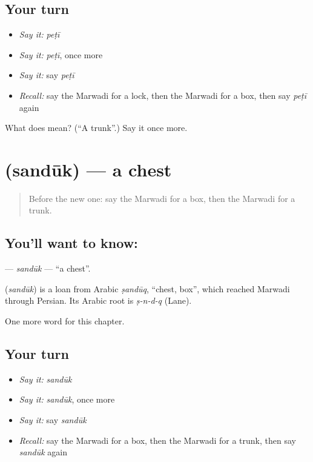 \subsection*{Your turn}
\begin{itemize}
\raggedright
  \item \emph{Say it:} \emph{peṭī}
  \item \emph{Say it:} \emph{peṭī}, once more
  \item \emph{Say it:} say \emph{peṭī}
  \item \emph{Recall:} say the Marwadi for a lock, then the Marwadi for a box, then say \emph{peṭī} again
\end{itemize}

\begin{tcolorbox}[breakable,colback=teal!4,colframe=teal!35!black,title={Before you move on}]
What does  mean? (\textquotedblleft{}A trunk\textquotedblright{}.) Say it once more.
\end{tcolorbox}
\section[\texorpdfstring{\mw{संदूक} (sandūk)}{संदूक (sandūk)}]{ (sandūk) — a chest}

\label{lesson:MW-C122-sanduk}



\begin{quote}
Before the new one: say the Marwadi for a box, then the Marwadi for a trunk.
\end{quote}

\subsection*{You'll want to know: }
\textbf{} — \emph{sandūk} — \textquotedblleft{}a chest\textquotedblright{}.

\begin{cousinweb}
\textbf{} (\emph{sandūk}) is a loan from Arabic \emph{ṣandūq}, \textquotedblleft{}chest, box\textquotedblright{}, which reached Marwadi through Persian. Its Arabic root is \emph{ṣ-n-d-q} (Lane).
\end{cousinweb}

\begin{grammarlens}[title={What you've built}]
One more word for this chapter.
\end{grammarlens}

\subsection*{Your turn}
\begin{itemize}
\raggedright
  \item \emph{Say it:} \emph{sandūk}
  \item \emph{Say it:} \emph{sandūk}, once more
  \item \emph{Say it:} say \emph{sandūk}
  \item \emph{Recall:} say the Marwadi for a box, then the Marwadi for a trunk, then say \emph{sandūk} again
\end{itemize}

